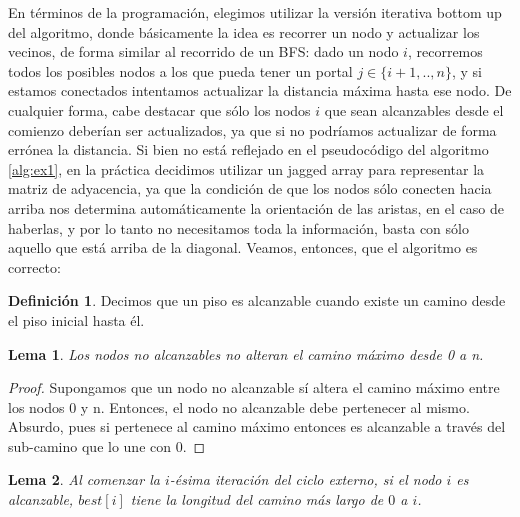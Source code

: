\documentclass{article}
\newtheorem{lemma}{Lema}[theorem]
\theoremstyle{definition}
\newtheorem{definition}{Definición}[section]
\theoremstyle{remark}
\begin{document}
En términos de la programación, elegimos utilizar la versión iterativa bottom up del algoritmo, donde básicamente la idea es recorrer un nodo y actualizar los vecinos, de forma similar al recorrido de un BFS: dado un nodo $i$, recorremos todos los posibles nodos a los que pueda tener un portal $j \in \{i + 1, .., n\}$, y si estamos conectados intentamos actualizar la distancia máxima hasta ese nodo. De cualquier forma, cabe destacar que sólo los nodos $i$ que sean alcanzables desde el comienzo deberían ser actualizados, ya que si no podríamos actualizar de forma errónea la distancia. Si bien no está reflejado en el pseudocódigo del algoritmo \ref{alg:ex1}, en la práctica decidimos utilizar un jagged array para representar la matriz de adyacencia, ya que la condición de que los nodos sólo conecten hacia arriba nos determina automáticamente la orientación de las aristas, en el caso de haberlas, y por lo tanto no necesitamos toda la información, basta con sólo aquello que está arriba de la diagonal. Veamos, entonces, que el algoritmo es correcto:

\begin{definition}
Decimos que un piso es alcanzable cuando existe un camino desde el piso inicial hasta él.
\end{definition}

\begin{lemma}
Los nodos no alcanzables no alteran el camino máximo desde 0 a n.
\end{lemma}

\begin{proof}
Supongamos que un nodo no alcanzable sí altera el camino máximo entre los nodos 0 y n. Entonces, el nodo no alcanzable debe pertenecer al mismo. Absurdo, pues si pertenece al camino máximo entonces es alcanzable a través del sub-camino que lo une con 0.
\end{proof}

\begin{lemma}
Al comenzar la $i$-ésima iteración del ciclo externo, si el nodo $i$ es alcanzable, $best[i]$ tiene la longitud del camino más largo de $0$ a $i$.
\end{lemma}
\end{document}

